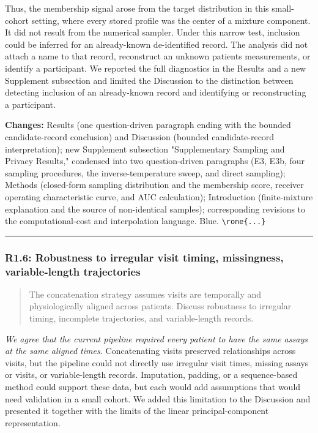 \documentclass[
  11pt,
  letterpaper,
]{article}
\begin{document}
Thus, the membership signal arose from the target distribution in this small-cohort setting, where every stored profile was the center of a mixture component. It did not result from the numerical sampler. Under this narrow test, inclusion could be inferred for an already-known de-identified record. The analysis did not attach a name to that record, reconstruct an unknown patient\textquotesingle s measurements, or identify a participant. We reported the full diagnostics in the Results and a new Supplement subsection and limited the Discussion to the distinction between detecting inclusion of an already-known record and identifying or reconstructing a participant.

\textbf{Changes:} Results (one question-driven paragraph ending with the bounded candidate-record conclusion) and Discussion (bounded candidate-record interpretation); new Supplement subsection "Supplementary Sampling and Privacy Results," condensed into two question-driven paragraphs (E3, E3b, four sampling procedures, the inverse-temperature sweep, and direct sampling); Methods (closed-form sampling distribution and the membership score, receiver operating characteristic curve, and AUC calculation); Introduction (finite-mixture explanation and the source of non-identical samples); corresponding revisions to the computational-cost and interpolation language. Blue. \texttt{\textbackslash{}rone\{...\}}

\begin{center}\rule{0.5\linewidth}{0.5pt}\end{center}

\subsubsection{R1.6: Robustness to irregular visit timing, missingness, variable-length trajectories}\label{r16-robustness-to-irregular-visit-timing-missingness-variable-length-trajectories}

\begin{quote}
The concatenation strategy assumes visits are temporally and physiologically aligned across patients. Discuss robustness to irregular timing, incomplete trajectories, and variable-length records.
\end{quote}

\emph{We agree that the current pipeline required every patient to have the same assays at the same aligned times.} Concatenating visits preserved relationships across visits, but the pipeline could not directly use irregular visit times, missing assays or visits, or variable-length records. Imputation, padding, or a sequence-based method could support these data, but each would add assumptions that would need validation in a small cohort. We added this limitation to the Discussion and presented it together with the limits of the linear principal-component representation.
\end{document}
